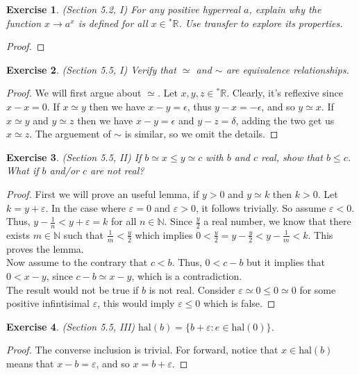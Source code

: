 \documentclass[a4paper, 11pt]{book}
\theoremstyle{plain}
\newtheorem{exercise}{Exercise}[chapter]
\theoremstyle{plain}
\newcommand{\N}{\mathbb{N}}
\newcommand{\R}{\mathbb{R}}
\newcommand{\ep}{\varepsilon}
\newcommand{\hyp}{{}^*}
\newcommand{\hal}{\text{hal}}
\begin{document}
  \begin{exercise}
    (Section  5.2, I)
    For any positive hyperreal $a$, explain why the function $x \rightarrow a^x$ is defined for all $x \in \hyp \R$. Use transfer to explore its properties.
  \end{exercise}
  \begin{proof}
    
  \end{proof}

  \begin{exercise}
    (Section 5.5, I)
    Verify that $\simeq$ and $\sim$ are equivalence relationships.
  \end{exercise}
  \begin{proof}
    We will first argue about $\simeq$. Let $x,y,z \in \hyp \R$. Clearly, it's reflexive since $x-x=0$. If $x \simeq y$ then we have $x-y= \epsilon$, thus $y-x=-\epsilon$, and so $y \simeq x$. If $x \simeq y$ and $y \simeq z$ then we have $x-y=\epsilon$ and $y-z=\delta$, adding the two get us $x \simeq z$. The arguement of $\sim$ is similar, so we omit the details.
  \end{proof}

  \begin{exercise}
    (Section 5.5, II)
    If $b \simeq x \leq y \simeq c$ with $b$ and $c$ real, show that $b \leq c$. What if $b$ and/or $c$ are not real?
  \end{exercise}
  \begin{proof}
    First we will prove an useful lemma, if $y>0$ and $y \simeq k$ then $k>0$. Let $k=y+\ep$. In the case where $\ep=0$ and $\ep>0$, it follows trivially. So assume $\ep<0$. Thus, $y-\frac{1}{n}<y+\ep=k$ for all $n \in \N$. Since $\frac{y}{2}$ a real number, we know that there exists $m \in \N$ such that $\frac{1}{m}<\frac{y}{2}$ which implies $0<\frac{y}{2}=y-\frac{y}{2}<y-\frac{1}{m}<k$. This proves the lemma. \\
    Now assume to the contrary that $c<b$. Thus, $0<c-b$ but it implies that $0<x-y$, since $c-b \simeq x-y$, which is a contradiction.\\
    The result would not be true if $b$ is not real. Consider $\ep \simeq 0 \leq 0 \simeq 0$ for some positive infintisimal $\ep$, this would imply $\ep \leq 0$ which is false. 
  \end{proof}

  \begin{exercise}
    (Section 5.5, III)
    $\hal(b)=\{b+\ep: e \in \hal (0)\}$.
  \end{exercise}
  \begin{proof}
    The converse inclusion is trivial. For forward, notice that $x \in \hal (b)$ means that $x-b=\ep$, and so $x=b+\ep$.
  \end{proof}
\end{document}

